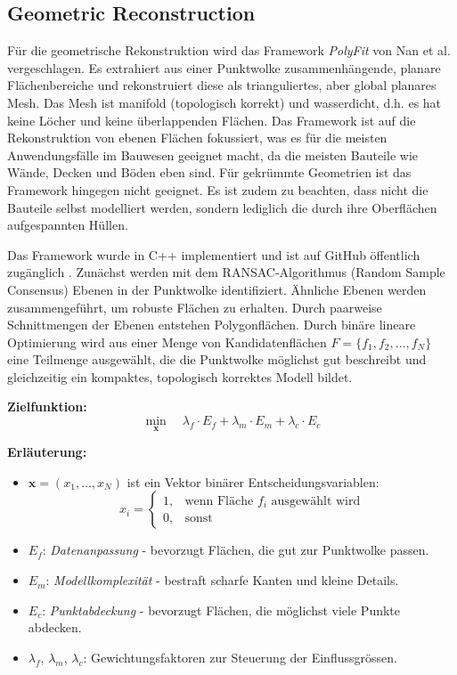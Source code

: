 \subsection{Geometric Reconstruction}
\begin{German}
    Für die geometrische Rekonstruktion wird das Framework \textit{PolyFit} von Nan et al. \cite{nanPolyFitFramework2023} vergeschlagen. Es extrahiert aus einer Punktwolke zusammenhängende, planare Flächenbereiche und rekonstruiert diese als trianguliertes, aber global planares Mesh. Das Mesh ist manifold (topologisch korrekt) und wasserdicht, d.h. es hat keine Löcher und keine überlappenden Flächen. Das Framework ist auf die Rekonstruktion von ebenen Flächen fokussiert, was es für die meisten Anwendungsfälle im Bauwesen geeignet macht, da die meisten Bauteile wie Wände, Decken und Böden eben sind. Für gekrümmte Geometrien ist das Framework hingegen nicht geeignet. Es ist zudem zu beachten, dass nicht die Bauteile selbst modelliert werden, sondern lediglich die durch ihre Oberflächen aufgespannten Hüllen.
    
    Das Framework wurde in C++ implementiert und ist auf GitHub öffentlich zugänglich \cite{nanLiangliangNanPolyFit2025}. Zunächst werden mit dem RANSAC-Algorithmus (Random Sample Consensus) Ebenen in der Punktwolke identifiziert. Ähnliche Ebenen werden zusammengeführt, um robuste Flächen zu erhalten. Durch paarweise Schnittmengen der Ebenen entstehen Polygonflächen. Durch binäre lineare Optimierung wird aus einer Menge von Kandidatenflächen $F = \{f_1, f_2, \dots, f_N\}$ eine Teilmenge ausgewählt, die die Punktwolke möglichst gut beschreibt und gleichzeitig ein kompaktes, topologisch korrektes Modell bildet.

    \vspace{1em}
    \noindent
    \textbf{Zielfunktion:}
    \[
    \min_{\mathbf{x}} \quad
    \lambda_f \cdot E_f + \lambda_m \cdot E_m + \lambda_c \cdot E_c
    \]

    \vspace{1em}
    \noindent
    \textbf{Erläuterung:}
    \begin{itemize}
    \item $\mathbf{x} = (x_1, \dots, x_N)$ ist ein Vektor binärer Entscheidungsvariablen:
        \[
        x_i =
        \begin{cases}
        1, & \text{wenn Fläche } f_i \text{ ausgewählt wird} \\
        0, & \text{sonst}
        \end{cases}
        \]
    \item $E_f$: \textit{Datenanpassung} - bevorzugt Flächen, die gut zur Punktwolke passen.
    \item $E_m$: \textit{Modellkomplexität} - bestraft scharfe Kanten und kleine Details.
    \item $E_c$: \textit{Punktabdeckung} - bevorzugt Flächen, die möglichst viele Punkte abdecken.
    \item $\lambda_f$, $\lambda_m$, $\lambda_c$: Gewichtungsfaktoren zur Steuerung der Einflussgrössen.
    \end{itemize}


\end{German}
